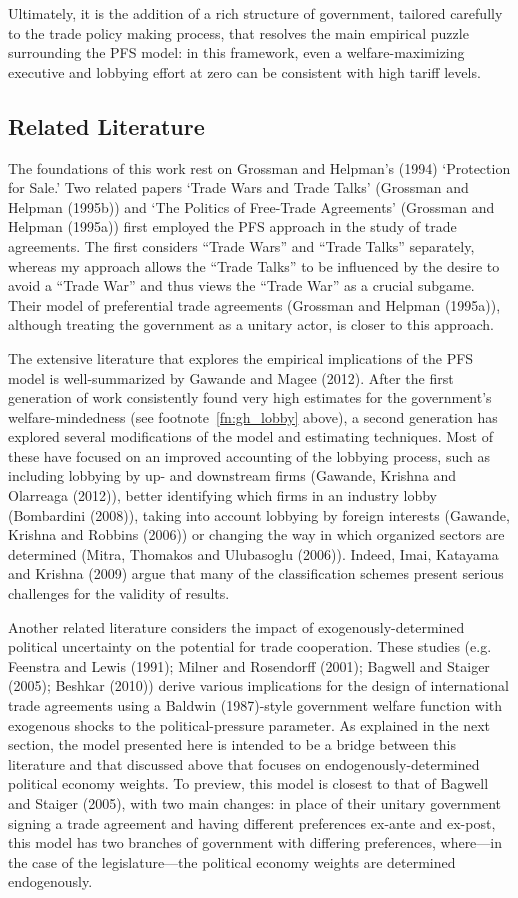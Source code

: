 \documentclass[10pt]{article}
\begin{document}
Ultimately, it is the addition of a rich structure of government, tailored carefully to the trade policy making process, that resolves the main empirical puzzle surrounding the PFS model: in this framework, even a welfare-maximizing executive and lobbying effort at zero can be consistent with high tariff levels. 

\subsection{Related Literature}
The foundations of this work rest on Grossman and Helpman's (1994) `Protection for Sale.' Two related papers `Trade Wars and Trade Talks' (Grossman and Helpman (1995b)) and `The Politics of Free-Trade Agreements' (Grossman and Helpman (1995a)) first employed the PFS approach in the study of trade agreements. The first considers ``Trade Wars'' and ``Trade Talks'' separately, whereas my approach allows the ``Trade Talks'' to be influenced by the desire to avoid a ``Trade War'' and thus views the ``Trade War'' as a crucial subgame. Their model of preferential trade agreements (Grossman and Helpman (1995a)), although treating the government as a unitary actor, is closer to this approach.

The extensive literature that explores the empirical implications of the PFS model is well-summarized by Gawande and Magee (2012). After the first generation of work consistently found very high estimates for the government's welfare-mindedness (see footnote~\ref{fn:gh_lobby} above), a second generation has explored several modifications of the model and estimating techniques. Most of these have focused on an improved accounting of the lobbying process, such as including lobbying by up- and downstream firms (Gawande, Krishna and Olarreaga (2012)), better identifying which firms in an industry lobby (Bombardini (2008)), taking into account lobbying by foreign interests (Gawande, Krishna and Robbins (2006)) or changing the way in which organized sectors are determined (Mitra, Thomakos and Ulubasoglu (2006)). Indeed, Imai, Katayama and Krishna (2009) argue that many of the classification schemes present serious challenges for the validity of results.
	
Another related literature considers the impact of exogenously-determined political uncertainty on the potential for trade cooperation. These studies (e.g. Feenstra and Lewis (1991); Milner and Rosendorff (2001); Bagwell and Staiger (2005); Beshkar (2010)) derive various implications for the design of international trade agreements using a Baldwin (1987)-style government welfare function with exogenous shocks to the political-pressure parameter. As explained in the next section, the model presented here is intended to be a bridge between this literature and that discussed above that focuses on endogenously-determined political economy weights. To preview, this model is closest to that of Bagwell and Staiger (2005), with two main changes: in place of their unitary government signing a trade agreement and having different preferences ex-ante and ex-post, this model has two branches of government with differing preferences, where---in the case of the legislature---the political economy weights are determined endogenously.
		
\end{document}
